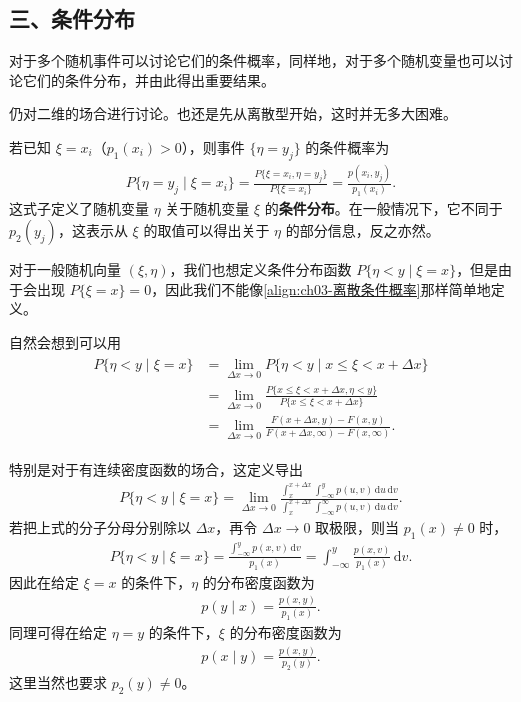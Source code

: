 \documentclass[../../main.tex]{subfiles}
\begin{document}
\subsection*{三、条件分布}

对于多个随机事件可以讨论它们的条件概率，同样地，对于多个随机变量也可以讨论它们的条件分布，并由此得出重要结果。

仍对二维的场合进行讨论。也还是先从离散型开始，这时并无多大困难。

若已知 $\xi=x_i$（$p_1(x_i)>0$），则事件 $\{\eta=y_j\}$ 的条件概率为
\begin{align}
P\{\eta=y_j\mid\xi=x_i\}=\frac{P\{\xi=x_i,\eta=y_j\}}{P\{\xi=x_i\}}=\frac{p(x_i,y_j)}{p_1(x_i)}.\label{align:ch03-离散条件概率}
\end{align}
这式子定义了随机变量 $\eta$ 关于随机变量 $\xi$ 的\textbf{条件分布}。在一般情况下，它不同于 $p_2(y_j)$，这表示从 $\xi$ 的取值可以得出关于 $\eta$ 的部分信息，反之亦然。

对于一般随机向量 $(\xi,\eta)$，我们也想定义条件分布函数 $P\{\eta<y\mid\xi=x\}$，但是由于会出现 $P\{\xi=x\}=0$，因此我们不能像\eqref{align:ch03-离散条件概率}那样简单地定义。

自然会想到可以用
\begin{align}
\begin{aligned}
P\{\eta<y\mid\xi=x\}&=\lim_{\Delta x\to 0}P\{\eta<y\mid x\leqslant\xi<x+\Delta x\}\\
&=\lim_{\Delta x\to 0}\frac{P\{x\leqslant\xi<x+\Delta x,\eta<y\}}{P\{x\leqslant\xi<x+\Delta x\}}\\
&=\lim_{\Delta x\to 0}\frac{F(x+\Delta x,y)-F(x,y)}{F(x+\Delta x,\infty)-F(x,\infty)}.
\end{aligned}\label{align:ch03-条件分布函数极限}
\end{align}

特别是对于有连续密度函数的场合，这定义导出
\begin{align*}P\{\eta<y\mid\xi=x\}=\lim_{\Delta x\to 0}\frac{\displaystyle\int_{x}^{x+\Delta x}\int_{-\infty}^{y}p(u,v)\,\mathrm{d}u\,\mathrm{d}v}{\displaystyle\int_{x}^{x+\Delta x}\int_{-\infty}^{\infty}p(u,v)\,\mathrm{d}u\,\mathrm{d}v}.\end{align*}
若把上式的分子分母分别除以 $\Delta x$，再令 $\Delta x\to 0$ 取极限，则当 $p_1(x)\neq 0$ 时，
\begin{align*}P\{\eta<y\mid\xi=x\}=\frac{\displaystyle\int_{-\infty}^{y}p(x,v)\,\mathrm{d}v}{p_1(x)}=\int_{-\infty}^{y}\frac{p(x,v)}{p_1(x)}\,\mathrm{d}v.\end{align*}
因此在给定 $\xi=x$ 的条件下，$\eta$ 的分布密度函数为
\begin{align}
p(y\mid x)=\frac{p(x,y)}{p_1(x)}.\label{align:ch03-条件密度xi}
\end{align}
同理可得在给定 $\eta=y$ 的条件下，$\xi$ 的分布密度函数为
\begin{align}
p(x\mid y)=\frac{p(x,y)}{p_2(y)}.\label{align:ch03-条件密度eta}
\end{align}
这里当然也要求 $p_2(y)\neq 0$。
\end{document}
